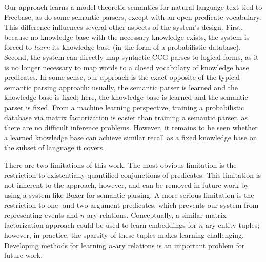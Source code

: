 \documentclass[11pt]{article}
\begin{document}
Our approach learns a model-theoretic semantics for natural language
text tied to Freebase, as do some semantic parsers, except with an
open predicate vocabulary. This difference influences several other
aspects of the system's design. First, because no knowledge base with
the necessary knowledge exists, the system is forced to \emph{learn}
its knowledge base (in the form of a probabilistic database). Second,
the system can directly map syntactic CCG parses to logical forms, as
it is no longer necessary to map words to a closed vocabulary of
knowledge base predicates. In some sense, our approach is the exact
opposite of the typical semantic parsing approach: usually, the
semantic parser is learned and the knowledge base is fixed; here, the
knowledge base is learned and the semantic parser is fixed. From a
machine learning perspective, training a probabilistic database via
matrix factorization is easier than training a semantic parser, as
there are no difficult inference problems. However, it remains to be
seen whether a learned knowledge base can achieve similar recall as a
fixed knowledge base on the subset of language it covers.

There are two limitations of this work. The most obvious limitation is
the restriction to existentially quantified conjunctions of
predicates. This limitation is not inherent to the approach, however,
and can be removed in future work by using a system like Boxer
\cite{bos2008} for semantic parsing. A more serious limitation is the
restriction to one- and two-argument predicates, which prevents our
system from representing events and $n$-ary relations. Conceptually, a
similar matrix factorization approach could be used to learn
embeddings for $n$-ary entity tuples; however, in practice, the
sparsity of these tuples makes learning challenging. Developing
methods for learning $n$-ary relations is an important problem for
future work.

\end{document}
